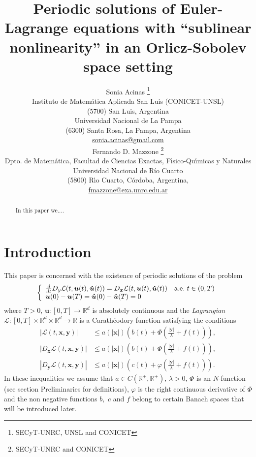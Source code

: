 \documentclass[twoside]{article}
\title{Periodic solutions of 
Euler-Lagrange equations with ``sublinear nonlinearity'' in an Orlicz-Sobolev space setting}
\author{Sonia Acinas \thanks{SECyT-UNRC, UNSL and CONICET}\\
Instituto de Matem\'atica Aplicada San Luis (CONICET-UNSL)\\
(5700) San Luis, Argentina\\
Universidad Nacional de La Pampa\\
(6300) Santa Rosa, La Pampa, Argentina\\
\url{sonia.acinas@gmail.com}\\[3mm]
Fernando D. Mazzone \thanks{SECyT-UNRC and CONICET}\\
Dpto. de Matem\'atica, Facultad de Ciencias Exactas, F\'{\i}sico-Qu\'{\i}micas y Naturales\\
Universidad Nacional de R\'{i}o Cuarto\\
(5800) R\'{\i}o Cuarto, C\'ordoba, Argentina,\\
\url{fmazzone@exa.unrc.edu.ar}
}
\date{}
\theoremstyle{remark}
\renewcommand{\b}[1]{\boldsymbol{#1}}
\newcommand{\rr}{\mathbb{R}}
\renewcommand{\leq}{\leqslant}
\begin{document}
\maketitle
%
\begingroup%
    \renewcommand{\thefootnote}{}%
    \endgroup
%
%
%
%

\begin{abstract}
In this paper we....
\end{abstract}




\pagestyle{fancy} \headheight 35pt \fancyhead{} \fancyfoot{}

\fancyfoot[C]{\thepage}  \fancyhead[CO]{\nouppercase{\section}}

\fancyhead[CO]{\nouppercase{\leftmark}}






\section{Introduction}
This paper is concerned with the existence of periodic solutions of the problem
\begin{equation}\label{ProbPrin}
    \left\{%
\begin{array}{ll}
   \frac{d}{dt} D_{y}\mathcal{L}(t,\b{u}(t),\b{\dot{u}}(t))= D_{\b{x}}\mathcal{L}(t,\b{u}(t),\b{\dot{u}}(t)) \quad \hbox{a.e.}\ t \in (0,T)\\
    \b{u}(0)-\b{u}(T)=\b{\dot{u}}(0)-\b{\dot{u}}(T)=0
\end{array}%
\right.
\end{equation}
where $T>0$, $\b{u}:[0,T]\to\rr^d$ is absolutely continuous and the \emph{Lagrangian} $\mathcal{L}:[0,T]\times\rr^d\times\rr^d\to\rr$ is a Carath\'eodory function satisfying the conditions
\begin{eqnarray}
|\mathcal{L}(t,\b{x},\b{y})| &\leq a(|\b{x}|)\left(b(t)+ \Phi\left(\frac{|\b{y}|}{\lambda}+f(t) \right)\right),\label{cotaL}\\
|D_{\b{x}}\mathcal{L}(t,\b{x},\b{y})| &\leq a(|\b{x}|)\left(b(t)+ \Phi\left(\frac{|\b{y}|}{\lambda}+f(t) \right)\right),\label{cotaDxL}\\
|D_{\b{y}}\mathcal{L}(t,\b{x},\b{y})| &\leq a(|\b{x}|)\left(c(t)+ \varphi\left(\frac{|\b{y}|}{\lambda}+f(t)\right)  \right).\label{cotaDyL}
\end{eqnarray}
In these inequalities we assume that  $a\in C(\mathbb{R}^+,\mathbb{R}^+)$, $\lambda>0$, $\Phi$ is an $N$-function (see section  Preliminaries  for definitions), $\varphi$ is the right continuous derivative of $\Phi$ and the non negative functions  $b,$ $c$ and $f$ belong to certain Banach spaces that  will be introduced later.
\end{document}
